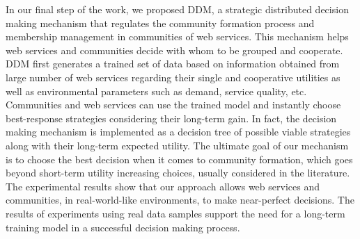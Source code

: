 In our final step of the work, we proposed DDM, a strategic distributed decision making mechanism that regulates the community formation process and  membership management in communities of web services. This mechanism helps web services and communities decide with whom to be grouped and cooperate. DDM first generates a trained set of data based on information obtained from large number of web services regarding their single and cooperative utilities as well as environmental parameters such as demand, service quality, etc. Communities and web services can use the trained model and instantly choose best-response strategies considering their long-term gain. In fact, the decision making mechanism is implemented as a decision tree of possible viable strategies along with their long-term expected utility. The ultimate goal of our mechanism is to choose the best decision when it comes to community formation, which goes beyond short-term utility increasing choices, usually considered in the literature. The experimental results show that our approach allows web services and communities, in real-world-like environments, to make near-perfect decisions. The results of experiments using real data samples support the need for a long-term training model in a successful decision making process.






